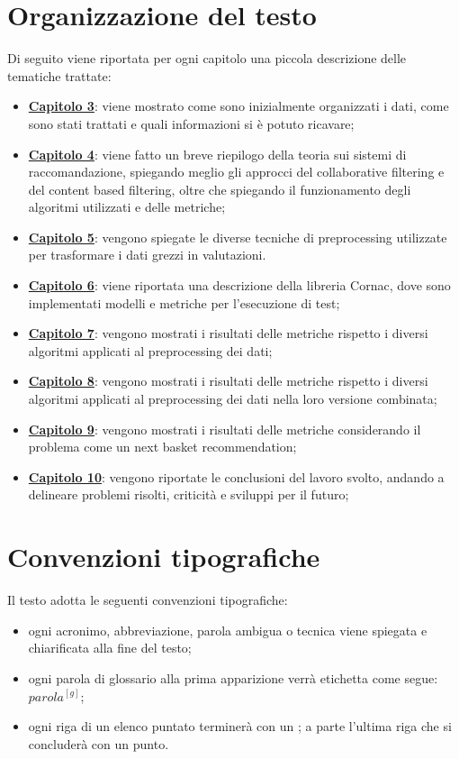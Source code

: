 \section{Organizzazione del testo}
Di seguito viene riportata per ogni capitolo una piccola descrizione delle tematiche trattate:
\begin{itemize}
	\item \hyperlink{(chap:capitolo3)}{\textbf{Capitolo 3}}: viene mostrato come sono inizialmente organizzati i dati, come sono stati trattati e quali informazioni si è potuto ricavare;
	\item \hyperlink{(chap:capitolo4)}{\textbf{Capitolo 4}}: viene fatto un breve riepilogo della teoria sui sistemi di raccomandazione, spiegando meglio gli approcci del collaborative filtering e del content based filtering, oltre che spiegando il funzionamento degli algoritmi utilizzati e delle metriche;
	\item \hyperlink{(chap:capitolo5)}{\textbf{Capitolo 5}}: vengono spiegate le diverse tecniche di preprocessing utilizzate per trasformare i dati grezzi in valutazioni.
	\item \hyperlink{(chap:capitolo6)}{\textbf{Capitolo 6}}: viene riportata una descrizione della libreria Cornac, dove sono implementati modelli e metriche per l'esecuzione di test;
	\item \hyperlink{(chap:capitolo7)}{\textbf{Capitolo 7}}: vengono mostrati i risultati delle metriche rispetto i diversi algoritmi applicati al preprocessing dei dati;
	\item \hyperlink{(chap:capitolo8)}{\textbf{Capitolo 8}}: vengono mostrati i risultati delle metriche rispetto i diversi algoritmi applicati al preprocessing dei dati nella loro versione combinata;
	\item \hyperlink{(chap:capitolo9)}{\textbf{Capitolo 9}}: vengono mostrati i risultati delle metriche considerando il problema come un next basket recommendation;
	\item \hyperlink{(chap:capitolo10)}{\textbf{Capitolo 10}}: vengono riportate le conclusioni del lavoro svolto, andando a delineare problemi risolti, criticità e sviluppi per il futuro;
\end{itemize}
\section{Convenzioni tipografiche}
Il testo adotta le seguenti convenzioni tipografiche:
\begin{itemize}
	\item ogni acronimo, abbreviazione, parola ambigua o tecnica viene spiegata e chiarificata alla fine del testo;
	\item ogni parola di glossario alla prima apparizione verrà etichetta come segue: $parola^{[g]}$;
	\item ogni riga di un elenco puntato terminerà con un ; a parte l'ultima riga che si concluderà con un punto.
\end{itemize}

